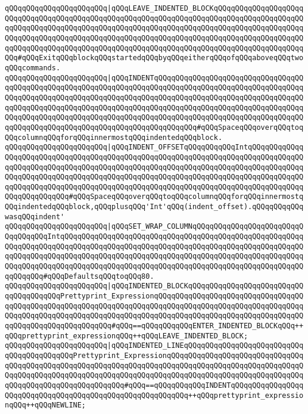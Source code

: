 \verb|qQQqqQQqqQQqqQQqqQQqqQQq|\verb#|qQQqLEAVE_INDENTED_BLOCKqQQqqQQqqQQqqQQqqQQqqQQqqQQqqQQqqQQqqQQqqQQqqQQqqQQqqQQqqQQqqQQqqQQqqQQqqQQqqQQqqQQqqQQqqQQqqQQqqQQqqQQqqQQqqQQqqQQqqQQqqQQqqQQqqQQqqQQqqQQqqQQqqQQqqQQqqQQqqQQqqQQqqQQqqQQqqQQqqQQqqQQqqQQqqQQqqQQqqQQqqQQqqQQqqQQqqQQqqQQqqQQqqQQqqQQqqQQqqQQqqQQqqQQqqQQqqQQqqQQqqQQqqQQqqQQqqQQqqQQqqQQqqQQqqQQqqQQqqQQqqQQq#\verb|#qQQqExitqQQqblockqQQqstartedqQQqbyqQQqeitherqQQqofqQQqaboveqQQqtwoqQQqcommands.|\newline
\verb|qQQqqQQqqQQqqQQqqQQqqQQq|\verb#|qQQqINDENTqQQqqQQqqQQqqQQqqQQqqQQqqQQqqQQqqQQqqQQqqQQqqQQqqQQqqQQqqQQqqQQqqQQqqQQqqQQqqQQqqQQqqQQqqQQqqQQqqQQqqQQqqQQqqQQqqQQqqQQqqQQqqQQqqQQqqQQqqQQqqQQqqQQqqQQqqQQqqQQqqQQqqQQqqQQqqQQqqQQqqQQqqQQqqQQqqQQqqQQqqQQqqQQqqQQqqQQqqQQqqQQqqQQqqQQqqQQqqQQqqQQqqQQqqQQqqQQqqQQqqQQqqQQqqQQqqQQqqQQqqQQqqQQqqQQqqQQqqQQqqQQqqQQqqQQqqQQqqQQqqQQqqQQqqQQqqQQqqQQqqQQqqQQqqQQqqQQqqQQq#\verb|#qQQqSpaceqQQqoverqQQqtoqQQqcolumnqQQqforqQQqinnermostqQQqindentedqQQqblock.|\newline
\verb|qQQqqQQqqQQqqQQqqQQqqQQq|\verb#|qQQqINDENT_OFFSETqQQqqQQqqQQqIntqQQqqQQqqQQqqQQqqQQqqQQqqQQqqQQqqQQqqQQqqQQqqQQqqQQqqQQqqQQqqQQqqQQqqQQqqQQqqQQqqQQqqQQqqQQqqQQqqQQqqQQqqQQqqQQqqQQqqQQqqQQqqQQqqQQqqQQqqQQqqQQqqQQqqQQqqQQqqQQqqQQqqQQqqQQqqQQqqQQqqQQqqQQqqQQqqQQqqQQqqQQqqQQqqQQqqQQqqQQqqQQqqQQqqQQqqQQqqQQqqQQqqQQqqQQqqQQqqQQqqQQqqQQqqQQqqQQqqQQqqQQqqQQqqQQqqQQqqQQqqQQqqQQq#\verb|#qQQqSpaceqQQqoverqQQqtoqQQqcolumnqQQqforqQQqinnermostqQQqindentedqQQqblock,qQQqplusqQQq'Int'qQQq(indent_offset).qQQqqQQqqQQqwasqQQqindent'|\newline
\verb|qQQqqQQqqQQqqQQqqQQqqQQq|\verb#|qQQqSET_WRAP_COLUMNqQQqqQQqqQQqqQQqqQQqqQQqqQQqqQQqqQQqIntqQQqqQQqqQQqqQQqqQQqqQQqqQQqqQQqqQQqqQQqqQQqqQQqqQQqqQQqqQQqqQQqqQQqqQQqqQQqqQQqqQQqqQQqqQQqqQQqqQQqqQQqqQQqqQQqqQQqqQQqqQQqqQQqqQQqqQQqqQQqqQQqqQQqqQQqqQQqqQQqqQQqqQQqqQQqqQQqqQQqqQQqqQQqqQQqqQQqqQQqqQQqqQQqqQQqqQQqqQQqqQQqqQQqqQQqqQQqqQQqqQQqqQQqqQQqqQQqqQQqqQQqqQQqqQQqqQQq#\verb|#qQQqDefaultsqQQqtoqQQq80.|\newline
\verb|qQQqqQQqqQQqqQQqqQQqqQQq|\verb#|qQQqINDENTED_BLOCKqQQqqQQqqQQqqQQqqQQqqQQqqQQqqQQqqQQqqQQqPrettyprint_ExpressionqQQqqQQqqQQqqQQqqQQqqQQqqQQqqQQqqQQqqQQqqQQqqQQqqQQqqQQqqQQqqQQqqQQqqQQqqQQqqQQqqQQqqQQqqQQqqQQqqQQqqQQqqQQqqQQqqQQqqQQqqQQqqQQqqQQqqQQqqQQqqQQqqQQqqQQqqQQqqQQqqQQqqQQqqQQqqQQqqQQqqQQqqQQqqQQqqQQqqQQq#\verb|#qQQq==qQQqqQQqqQQqENTER_INDENTED_BLOCKqQQq++qQQqprettyprint_expressionqQQq++qQQqLEAVE_INDENTED_BLOCK;|\newline
\verb|qQQqqQQqqQQqqQQqqQQqqQQq|\verb#|qQQqINDENTED_LINEqQQqqQQqqQQqqQQqqQQqqQQqqQQqqQQqqQQqqQQqqQQqPrettyprint_ExpressionqQQqqQQqqQQqqQQqqQQqqQQqqQQqqQQqqQQqqQQqqQQqqQQqqQQqqQQqqQQqqQQqqQQqqQQqqQQqqQQqqQQqqQQqqQQqqQQqqQQqqQQqqQQqqQQqqQQqqQQqqQQqqQQqqQQqqQQqqQQqqQQqqQQqqQQqqQQqqQQqqQQqqQQqqQQqqQQqqQQqqQQqqQQqqQQqqQQqqQQq#\verb|#qQQq==qQQqqQQqqQQqINDENTqQQqqQQqqQQqqQQqqQQqqQQqqQQqqQQqqQQqqQQqqQQqqQQqqQQqqQQqqQQq++qQQqprettyprint_expressionqQQq++qQQqNEWLINE;|\newline
